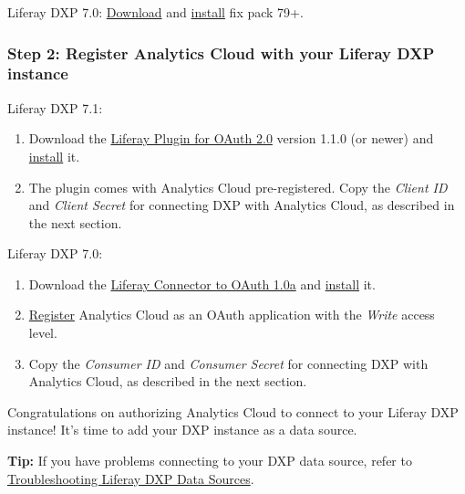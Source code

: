 Liferay DXP 7.0: \href{https://customer.liferay.com/downloads}{Download}
and
\href{/docs/7-0/deploy/-/knowledge_base/d/patching-tool\#installing-patches}{install}
fix pack 79+.

\subsubsection{Step 2: Register Analytics Cloud with your Liferay DXP
instance}\label{step-2-register-analytics-cloud-with-your-liferay-dxp-instance}

Liferay DXP 7.1:

\begin{enumerate}
\def\labelenumi{\arabic{enumi}.}
\item
  Download the
  \href{https://web.liferay.com/marketplace/-/mp/application/109571986}{Liferay
  Plugin for OAuth 2.0} version 1.1.0 (or newer) and
  \href{/docs/7-1/user/-/knowledge_base/u/installing-apps-manually}{install}
  it.
\item
  The plugin comes with Analytics Cloud pre-registered. Copy the
  \emph{Client ID} and \emph{Client Secret} for connecting DXP with
  Analytics Cloud, as described in the next section.
\end{enumerate}

Liferay DXP 7.0:

\begin{enumerate}
\def\labelenumi{\arabic{enumi}.}
\item
  Download the
  \href{https://web.liferay.com/marketplace/-/mp/application/45261909}{Liferay
  Connector to OAuth 1.0a} and
  \href{/docs/7-0/user/-/knowledge_base/u/installing-apps-manually}{install}
  it.
\item
  \href{/docs/7-0/deploy/-/knowledge_base/d/oauth}{Register} Analytics
  Cloud as an OAuth application with the \emph{Write} access level.
\item
  Copy the \emph{Consumer ID} and \emph{Consumer Secret} for connecting
  DXP with Analytics Cloud, as described in the next section.
\end{enumerate}

Congratulations on authorizing Analytics Cloud to connect to your
Liferay DXP instance! It's time to add your DXP instance as a data
source.

\noindent\hrulefill

\textbf{Tip:} If you have problems connecting to your DXP data source,
refer to
\href{https://github.com/liferay/liferay-docs/blob/7.1.x/discover/analytics-cloud/articles/06-troubleshooting/00-troubleshooting-data-sources-intro.markdown}{Troubleshooting
Liferay DXP Data Sources}.

